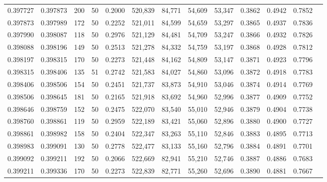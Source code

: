 \begin{tabular}{rrrrrrrrrrrrr}
0.397727 & 0.397873 &   200 &  50 &                                     0.2000 & 520,839 &  84,771 &  54,609 &  53,347 & 0.3862 & 0.4942 & 0.7852 \\
0.397873 & 0.397989 &   172 &  50 &                                     0.2252 & 521,011 &  84,599 &  54,659 &  53,297 & 0.3865 & 0.4937 & 0.7836 \\
0.397990 & 0.398087 &   118 &  50 &                                     0.2976 & 521,129 &  84,481 &  54,709 &  53,247 & 0.3866 & 0.4932 & 0.7826 \\
0.398088 & 0.398196 &   149 &  50 &                                     0.2513 & 521,278 &  84,332 &  54,759 &  53,197 & 0.3868 & 0.4928 & 0.7812 \\
0.398197 & 0.398315 &   170 &  50 &                                     0.2273 & 521,448 &  84,162 &  54,809 &  53,147 & 0.3871 & 0.4923 & 0.7796 \\
0.398315 & 0.398406 &   135 &  51 &                                     0.2742 & 521,583 &  84,027 &  54,860 &  53,096 & 0.3872 & 0.4918 & 0.7783 \\
0.398406 & 0.398506 &   154 &  50 &                                     0.2451 & 521,737 &  83,873 &  54,910 &  53,046 & 0.3874 & 0.4914 & 0.7769 \\
0.398506 & 0.398645 &   181 &  50 &                                     0.2165 & 521,918 &  83,692 &  54,960 &  52,996 & 0.3877 & 0.4909 & 0.7752 \\
0.398646 & 0.398759 &   152 &  50 &                                     0.2475 & 522,070 &  83,540 &  55,010 &  52,946 & 0.3879 & 0.4904 & 0.7738 \\
0.398760 & 0.398861 &   119 &  50 &                                     0.2959 & 522,189 &  83,421 &  55,060 &  52,896 & 0.3880 & 0.4900 & 0.7727 \\
0.398861 & 0.398982 &   158 &  50 &                                     0.2404 & 522,347 &  83,263 &  55,110 &  52,846 & 0.3883 & 0.4895 & 0.7713 \\
0.398983 & 0.399091 &   130 &  50 &                                     0.2778 & 522,477 &  83,133 &  55,160 &  52,796 & 0.3884 & 0.4891 & 0.7701 \\
0.399092 & 0.399211 &   192 &  50 &                                     0.2066 & 522,669 &  82,941 &  55,210 &  52,746 & 0.3887 & 0.4886 & 0.7683 \\
0.399211 & 0.399336 &   170 &  50 &                                     0.2273 & 522,839 &  82,771 &  55,260 &  52,696 & 0.3890 & 0.4881 & 0.7667 \\

\end{tabular}
